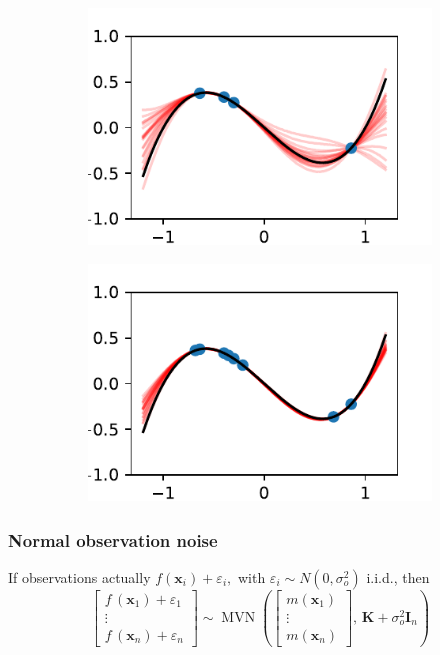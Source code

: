 \documentclass{beamer}
\DeclareMathOperator{\MVN}{MVN}
\begin{document}
\begin{frame}
\begin{figure}
\begin{subfigure}[t]{0.4\textwidth}
            \includegraphics[width=\textwidth]{cub_GP_4_iters.pdf}
        \end{subfigure}%
        \begin{subfigure}[t]{0.4\textwidth}
            \centering
            \includegraphics[width=\textwidth]{cub_GP_8_iters.pdf}
        \end{subfigure}%
    \end{figure}
\end{frame}

\begin{frame}
    \frametitle{Normal observation noise}
    If observations actually $f(\mathbf{x}_i) + \varepsilon_i,$ with
    $\varepsilon_i \sim N(0, \sigma^2_o)$ i.i.d., then
    $$
        \begin{bmatrix}
            f\,(\mathbf{x}_1) + \varepsilon_1 \\
            \vdots                            \\
            f\,(\mathbf{x}_n) + \varepsilon_n
        \end{bmatrix} \sim
        \MVN\left(\begin{bmatrix}
            m(\mathbf{x}_1) \\ \vdots\\ m(\mathbf{x}_n)
        \end{bmatrix},\, \mathbf{K} + \sigma^2_o\mathbf{I}_n\right)$$
\end{frame}
\end{document}
